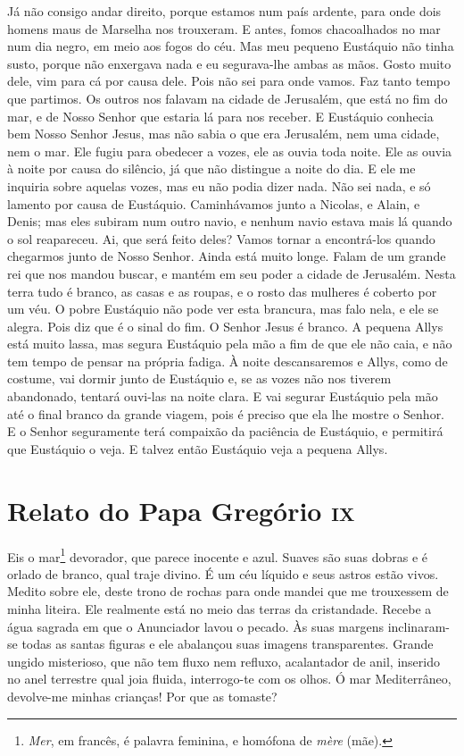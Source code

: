 Já não consigo andar direito, porque estamos num país ardente, para onde
dois homens maus de Marselha nos trouxeram. E antes, fomos chacoalhados no
mar num dia negro, em meio aos fogos do céu. Mas meu pequeno Eustáquio não
tinha susto, porque não enxergava nada e eu segurava-lhe ambas as mãos.
Gosto muito dele, vim para cá por causa dele. Pois não sei para onde
vamos. Faz tanto tempo que partimos. Os outros nos falavam na cidade de
Jerusalém, que está no fim do mar, e de Nosso Senhor que estaria lá para
nos receber. E Eustáquio conhecia bem Nosso Senhor Jesus, mas não sabia o
que era Jerusalém, nem uma cidade, nem o mar. Ele fugiu para obedecer a
vozes, ele as ouvia toda noite. Ele as ouvia à noite por causa do
silêncio, já que não distingue a noite do dia. E ele me inquiria sobre
aquelas vozes, mas eu não podia dizer nada. Não sei nada, e só lamento por
causa de Eustáquio. Caminhávamos junto a Nicolas, e Alain, e Denis; mas
eles subiram num outro navio, e nenhum navio estava mais lá quando o sol
reapareceu. Ai, que será feito deles? Vamos tornar a encontrá-los quando
chegarmos junto de Nosso Senhor. Ainda está muito longe. Falam de um
grande rei que nos mandou buscar, e mantém em seu poder a cidade de
Jerusalém. Nesta terra tudo é branco, as casas e as roupas, e o rosto das
mulheres é coberto por um véu. O pobre Eustáquio não pode ver esta
brancura, mas falo nela, e ele se alegra. Pois diz que é o sinal do fim. O
Senhor Jesus é branco. A pequena Allys está muito lassa, mas segura
Eustáquio pela mão a fim de que ele não caia, e não tem tempo de pensar na
própria fadiga. À noite descansaremos e Allys, como de costume, vai dormir
junto de Eustáquio e, se as vozes não nos tiverem abandonado, tentará
ouvi-las na noite clara. E vai segurar Eustáquio pela mão até o final
branco da grande viagem, pois é preciso que ela lhe mostre o Senhor. E o
Senhor seguramente terá compaixão da paciência de Eustáquio, e permitirá
que Eustáquio o veja. E talvez então Eustáquio veja a pequena Allys.

\chapter{Relato do Papa Gregório \textsc{ix}}

Eis o mar\footnote{ \textit{Mer}, em francês, é palavra feminina, e
homófona de \textit{mère} (mãe).} devorador, que parece inocente e azul.
Suaves são suas dobras e é orlado de branco, qual traje divino. É um céu
líquido e seus astros estão vivos. Medito sobre ele, deste trono de rochas
para onde mandei que me trouxessem de minha liteira. Ele realmente está no
meio das terras da cristandade. Recebe a água sagrada em que o Anunciador
lavou o pecado. Às suas margens inclinaram-se todas as santas figuras e
ele abalançou suas imagens transparentes. Grande ungido misterioso, que
não tem fluxo nem refluxo, acalantador de anil, inserido no anel terrestre
qual joia fluida, interrogo-te com os olhos. Ó mar Mediterrâneo,
devolve-me minhas crianças! Por que as tomaste?

